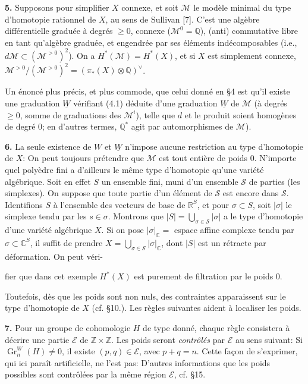 \documentclass[8pt]{extarticle}
\newcommand{\DSourceFolio}{--}
\newcommand{\DAuthorityPage}{--}
\newcommand{\SourcePage}[2]{%
  \renewcommand{\DSourceFolio}{#1}%
  \renewcommand{\DAuthorityPage}{#2}%
  \thispagestyle{dpage}%
}
\newcommand{\EndSourcePage}{\clearpage}
\newcommand{\ReaderFont}{\fontsize{7.35}{8.15}\selectfont}
\newcommand{\NumPara}[1]{\par\noindent\textbf{#1}\enspace}
\newcommand{\Q}{\mathbb{Q}}
\newcommand{\C}{\mathbb{C}}
\newcommand{\R}{\mathbb{R}}
\newcommand{\Z}{\mathbb{Z}}
\newcommand{\Gr}{\operatorname{Gr}}
\newcommand{\Wg}{\underline{W}}
\newcommand{\region}{\mathscr{E}}
\newcommand{\Mmin}{\mathscr{M}}
\newcommand{\Simp}{\mathscr{S}}
\begin{document}
\NumPara{5.} Supposons pour simplifier \(X\) connexe, et soit \(\Mmin\) le modèle minimal du type d'homotopie rationnel de \(X\), au sens de Sullivan [7]. C'est une algèbre différentielle graduée à degrés \(\ge0\), connexe (\(\Mmin^0=\Q\)), (anti) commutative libre en tant qu'algèbre graduée, et engendrée par ses éléments indécomposables (i.e., \(d\Mmin\subset(\Mmin^{>0})^2\)). On a \(H^*(\Mmin)=H^*(X)\), et si \(X\) est simplement connexe, \(\Mmin^{>0}/(\Mmin^{>0})^2=(\pi_*(X)\otimes\Q)^\vee\).

Un énoncé plus précis, et plus commode, que celui donné en §4 est qu'il existe une graduation \(\Wg\) vérifiant (4.1) déduite d'une graduation \(\Wg\) de \(\Mmin\) (à degrés \(\ge0\), somme de graduations des \(\Mmin^i\)), telle que \(d\) et le produit soient homogènes de degré 0; en d'autres termes, \(\Q^*\) agit par automorphismes de \(\Mmin\)).

\NumPara{6.} La seule existence de \(W\) et \(\Wg\) n'impose aucune restriction au type d'homotopie de \(X\): On peut toujours prétendre que \(\Mmin\) est tout entière de poids 0. N'importe quel polyèdre fini a d'ailleurs le même type d'homotopie qu'une variété algébrique. Soit en effet \(S\) un ensemble fini, muni d'un ensemble \(\Simp\) de parties (les simplexes). On suppose que toute partie d'un élément de \(\Simp\) est encore dans \(\Simp\). Identifions \(S\) à l'ensemble des vecteurs de base de \(\R^S\), et pour \(\sigma\subset S\), soit \(|\sigma|\) le simplexe tendu par les \(s\in\sigma\). Montrons que \(|S|=\bigcup_{\sigma\in\Simp}|\sigma|\) a le type d'homotopie d'une variété algébrique \(X\). Si on pose \(|\sigma|_{\C}=\) espace affine complexe tendu par \(\sigma\subset\C^S\), il suffit de prendre \(X=\bigcup_{\sigma\in\Simp}|\sigma|_{\C}\), dont \(|S|\) est un rétracte par déformation. On peut véri-
\EndSourcePage

\SourcePage{82}{4}
\ReaderFont
fier que dans cet exemple \(H^*(X)\) est purement de filtration par le poids 0.

Toutefois, dès que les poids sont non nuls, des contraintes apparaissent sur le type d'homotopie de \(X\) (cf. §10.). Les règles suivantes aident à localiser les poids.

\NumPara{7.} Pour un groupe de cohomologie \(H\) de type donné, chaque règle consistera à décrire une partie \(\region\) de \(\Z\times\Z\). Les poids seront \emph{contrôlés} par \(\region\) au sens suivant: Si \(\Gr_n^W(H)\ne0\), il existe \((p,q)\in\region\), avec \(p+q=n\). Cette façon de s'exprimer, qui ici paraît artificielle, ne l'est pas: D'autres informations que les poids possibles sont contrôlées par la même région \(\region\), cf. §15.
\end{document}
